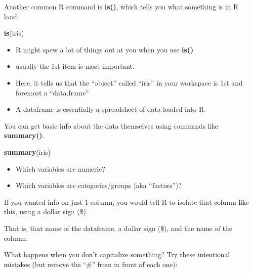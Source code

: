\documentclass[]{book}
\newenvironment{Shaded}{\begin{snugshade}}{\end{snugshade}}
\newcommand{\KeywordTok}[1]{\textcolor[rgb]{0.13,0.29,0.53}{\textbf{#1}}}
\newcommand{\OperatorTok}[1]{\textcolor[rgb]{0.81,0.36,0.00}{\textbf{#1}}}
\newcommand{\NormalTok}[1]{#1}
\providecommand{\tightlist}{%
  \setlength{\itemsep}{0pt}\setlength{\parskip}{0pt}}
\theoremstyle{definition}
\theoremstyle{definition}
\theoremstyle{definition}
\theoremstyle{remark}
\begin{document}
Another common R command is \textbf{is()}, which tells you what
something is in R land.

\begin{Shaded}
\begin{Highlighting}[]
\KeywordTok{is}\NormalTok{(iris)}
\end{Highlighting}
\end{Shaded}

\begin{itemize}
\tightlist
\item
  R might spew a lot of things out at you when you use \textbf{is()}
\item
  usually the 1st item is most important.\\
\item
  Here, it tells us that the ``object'' called ``iris'' in your
  workspace is 1st and foremost a ``data.frame''
\item
  A dataframe is essentially a spreadsheet of data loaded into R.
\end{itemize}

You can get basic info about the data themselves using commands like
\textbf{summary()}.

\begin{Shaded}
\begin{Highlighting}[]
\KeywordTok{summary}\NormalTok{(iris)}
\end{Highlighting}
\end{Shaded}

\begin{itemize}
\tightlist
\item
  Which variables are numeric?
\item
  Which variables are categories/groups (aka ``factors'')?
\end{itemize}

If you wanted info on just 1 column, you would tell R to isolate that
column like this, using a dollar sign (\$).

\begin{Shaded}
\end{Shaded}

That is, that name of the dataframe, a dollar sign (\$), and the name of
the column.

What happens when you don't capitalize something? Try these intentional
mistakes (but remove the ``\#'' from in front of each one):
\end{document}

